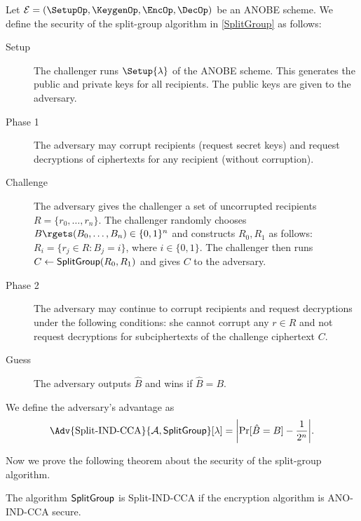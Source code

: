 \begin{definition}\label{SplitGroupSecurity}
  Let \(\mathcal{E} = (\SetupOp, \KeygenOp, \EncOp, \DecOp)\) be an \ac{ANOBE} 
  scheme.
  We define the security of the split-group algorithm in \cref{SplitGroup} as 
  follows:
  \begin{description}
    \item[Setup] The challenger runs \(\Setup{\lambda}\) of the \ac{ANOBE} 
      scheme.
      This generates the public and private keys for all recipients.
      The public keys are given to the adversary.

    \item[Phase 1] The adversary may corrupt recipients (request secret keys) 
      and request decryptions of ciphertexts for any recipient (without 
      corruption).

    \item[Challenge] The adversary gives the challenger a set of uncorrupted 
      recipients \(R = \{r_0, \ldots, r_n\}\).
      The challenger randomly chooses \(B\rgets (B_0, \ldots, B_n) \in \{0, 
        1\}^n\) and constructs \(R_0, R_1\) as follows:
      \(R_i = \{ r_j\in R\colon B_j = i\}\), where \(i\in \{0, 1\}\).
      The challenger then runs \(C\gets \SplitGroup[R_0, R_1]\) and gives \(C\) 
      to the adversary.

    \item[Phase 2] The adversary may continue to corrupt recipients and request 
      decryptions under the following conditions:
      she cannot corrupt any \(r\in R\) and not request decryptions for 
      subciphertexts of the challenge ciphertext \(C\).

    \item[Guess] The adversary outputs \(\hat{B}\) and wins if \(\hat{B} 
        = B\).
  \end{description}
  We define the adversary's advantage as \[\Adv{\text{Split-IND-CCA}}{\A, 
      \SplitGroupOp}[\lambda] = \mleft|\Pr[ \hat{B} 
    = B ] - \frac{1}{2^n}\mright|.\]
\end{definition}

Now we prove the following theorem about the security of the split-group 
algorithm.

\begin{theorem}
  The algorithm \(\operatorname{\mathsf{SplitGroup}}\) is Split-IND-CCA if the encryption algorithm 
  is ANO-IND-CCA secure.
\end{theorem}

